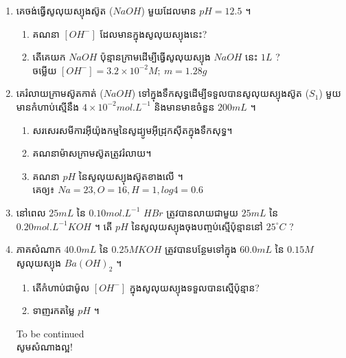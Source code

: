 \documentclass[12pt, a4paper]{article}
\begin{document}
\begin{enumerate}[m, 2]
\begin{enumerate}[k]
		\end{enumerate}
		\item គេចង់ធ្វើសូលុយស្យុងស៊ូត ($NaOH$) មួយដែលមាន $pH=12.5$ ។
		\begin{enumerate}[k]
			\item គណនា $[OH^-]$ ដែលមានក្នុងសូលុយស្យុងនេះ?
			\item តើគេយក $NaOH$ ប៉ុន្មានក្រាមដើម្បីធ្វើសូលុយស្យុង $NaOH$ នេះ $1L$ ?\\ ចម្លើយ $[OH^-]=3.2\times10^{-2}M;~m=1.28g$
		\end{enumerate}  
		\item គេរំលាយក្រាមស៊ូតកាត់ ($NaOH$) ទៅក្នុងទឹកសុទ្ធដើម្បីទទួលបានសូលុយស្យុងស៊ូត ($S_1$) មួយមានកំហាប់ស្មើនឹង $4\times10^{-2}mol.L^{-1}$ និងមានមាឌចំនួន $200mL$ ។
		\begin{enumerate}[k]
			\item សរសេរសមីការអ៊ីយ៉ុងកម្មនៃសូដ្យូមអ៊ីដ្រុកស៊ីតក្នុងទឹកសុទ្ធ។
			\item គណនាម៉ាសក្រាមស៊ូតត្រូវរំលាយ។
			\item គណនា $pH$ នៃសូលុយស្យុងស៊ូតខាងលើ ។ \\គេឲ្យ៖ $Na=23, O=16, H=1, log4=0.6$
		\end{enumerate}
		\item នៅពេល $25 mL$ នៃ $0.10mol.L^{-1}$ $HBr$ ត្រូវបានលាយជាមួយ $25mL$ នៃ $0.20mol.L^{-1} KOH$ ។ តើ $pH$ នៃសូលុយស្យុងចុងបញ្ចប់ស្មើប៉ុន្មាននៅ $25^\circ C$ ?
		\item ភាគសំណាក $40.0mL$ នៃ $0.25M KOH$ ត្រូវបានបន្ថែមទៅក្នុង $60.0mL$ នៃ $0.15 M$ សូលុយស្យុង $Ba(OH)_2$ ។
		\begin{enumerate}[k]
			\item តើកំហាប់ជាម៉ូល $[OH^-]$ ក្នុងសូលុយស្យុងទទួលបានស្មើប៉ុន្មាន?
			\item ទាញរកតម្លៃ $pH$ ។
		\end{enumerate}
	\begin{center}
		To be continued\\
		\sffamily\color{black}
		សូមសំណាងល្អ!
	\end{center}\newpage
\end{enumerate}
	
\end{document}
